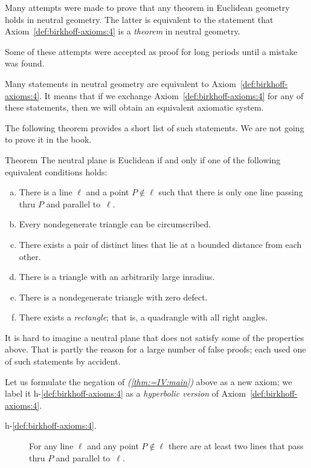 Many attempts were made to prove that any theorem in Euclidean geometry holds in neutral geometry.
The latter is equivalent to the statement that Axiom~\ref{def:birkhoff-axioms:4} is a \textit{theorem} in neutral geometry.

Some of these attempts were accepted as proof for long periods until a mistake was found.

Many statements in neutral geometry are equivalent to Axiom~\ref{def:birkhoff-axioms:4}.
It means that if we exchange Axiom~\ref{def:birkhoff-axioms:4} for any of these statements, then we will obtain an equivalent axiomatic system.

The following theorem provides a short list of such statements.
We are not going to prove it in the book.

\begin{thm}{Theorem}\label{thm:=IV}
The neutral plane is Euclidean if and only if one of the following equivalent conditions holds:
\begin{enumerate}[(a)]
\item\label{thm:=IV:main} 
There is a line $\ell$ 
and a point $P\notin\ell$ 
such that there is only one line passing thru $P$ 
and parallel to~$\ell$.
\item 
Every nondegenerate triangle can be circumscribed.
\item
There exists a pair of distinct lines that lie at a bounded distance from each other.
\item
There is a triangle with an arbitrarily large inradius.
\item\label{thm:=IV:defect}
There is a nondegenerate triangle with zero defect.
\item\label{thm:=IV:rectangle}
There exists a \emph{rectangle}; that is, a quadrangle with all right angles.
\end{enumerate}
\end{thm}

It is hard to imagine a neutral plane that does not satisfy some of the properties above.
That is partly the reason for a large number of false proofs;
each used one of such statements by accident.

Let us formulate the negation of \textit{(\ref{thm:=IV:main})} above as a new axiom;
we label it h-$\!$\ref{def:birkhoff-axioms:4} as a \textit{hyperbolic version} of Axiom~\ref{def:birkhoff-axioms:4}.

\begin{framed}
\begin{description}
\item[{\rm h-$\!$\ref{def:birkhoff-axioms:4}.}]\label{def:hyperbolic-4a}  
For any line $\ell$ and any point $P\notin\ell$ 
there are at least two lines that pass thru $P$ and parallel to~$\ell$.
\end{description}
\end{framed}

